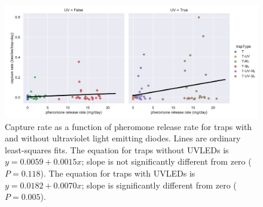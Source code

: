 \documentclass[12pt,letterpaper,english,bibliography=totocnumbered, abstract=on]{scrartcl}
\begin{document}
\begin{figure}[h]
\centering
\includegraphics[width=1\linewidth]{images/trapcatch-lmplot}
\caption{
	Capture rate as a function of pheromone release rate for traps with and without ultraviolet light emitting diodes.
	Lines are ordinary least-squares fits.	
	The equation for traps without UVLEDs is $y = 0.0059 + 0.0015x$; slope is not significantly different from zero ($P=0.118$).
	The equation for traps with UVLEDs is $y = 0.0182 + 0.0070x$; slope is significantly different from zero ($P=0.005$).
	}
\label{fig:trapcatch-lmplot}
\end{figure}

\printbibliography	
\end{document}
